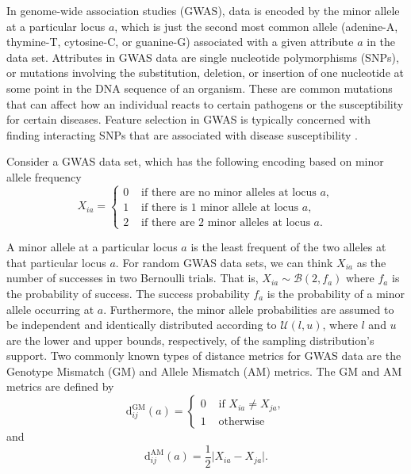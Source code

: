 \documentclass[10pt,letterpaper]{article}
\begin{document}
In genome-wide association studies (GWAS), data is encoded by the minor allele at a particular locus $a$, which is just the second most common allele (adenine-A, thymine-T, cytosine-C, or guanine-G) associated with a given attribute $a$ in the data set. Attributes in GWAS data are single nucleotide polymorphisms (SNPs), or mutations involving the substitution, deletion, or insertion of one nucleotide at some point in the DNA sequence of an organism. These are common mutations that can affect how an individual reacts to certain pathogens or the susceptibility for certain diseases. Feature selection in GWAS is typically concerned with finding interacting SNPs that are associated with disease susceptibility \cite{li2014}.

Consider a GWAS data set, which has the following encoding based on minor allele frequency
%
\begin{equation}\label{eq:gwas_data}
X_{ia} = \begin{cases}
0 & \text{ if there are no minor alleles at locus } a,  \\
1 & \text{ if there is 1 minor allele at locus } a, \\
2 & \text{ if there are 2 minor alleles at locus } a.
\end{cases}
\end{equation}

A minor allele at a particular locus $a$ is the least frequent of the two alleles at that particular locus $a$. For random GWAS data sets, we can think $X_{ia}$ as the number of successes in two Bernoulli trials. That is, $X_{ia} \sim \mathcal{B}(2,f_a)$ where $f_a$ is the probability of success. The success probability $f_a$ is the probability of a minor allele occurring at $a$. Furthermore, the minor allele probabilities are assumed to be independent and identically distributed according to $\mathcal{U}(l,u)$, where $l$ and $u$ are the lower and upper bounds, respectively, of the sampling distribution's support. Two commonly known types of distance metrics for GWAS data are the Genotype Mismatch (GM) and Allele Mismatch (AM) metrics. The GM and AM metrics are defined by
%
\begin{equation}\label{eq:diff_GM}
\text{d}^\text{GM}_{ij}(a) = \begin{cases} 
0 & \text{ if } X_{ia} \neq X_{ja}, \\
1 & \text{ otherwise}
\end{cases}
\end{equation}
%
and
%
\begin{equation}\label{eq:diff_AM}
\text{d}^\text{AM}_{ij}(a) = \frac{1}{2}\bigl|X_{ia} - X_{ja}\bigr|.
\end{equation}
\end{document}
